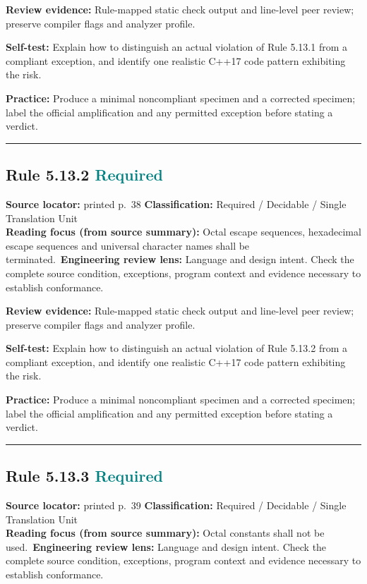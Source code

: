 \documentclass[10pt,letterpaper]{article}
\begin{document}
\textbf{Review evidence:} Rule-mapped static check output and line-level peer review; preserve compiler flags and analyzer profile.

\textbf{Self-test:} Explain how to distinguish an actual violation of Rule 5.13.1 from a compliant exception, and identify one realistic C++17 code pattern exhibiting the risk.\par
\textbf{Practice:} Produce a minimal noncompliant specimen and a corrected specimen; label the official amplification and any permitted exception before stating a verdict.
\smallskip\hrule\smallskip
\subsection*{Rule 5.13.2 \enspace \texorpdfstring{\small\textcolor{teal}{Required}}{Required}}
\noindent\textbf{Source locator:} printed p.~38 \quad\textbf{Classification:} Required / Decidable / Single Translation Unit\\
\textbf{Reading focus (from source summary):} Octal escape sequences, hexadecimal escape sequences and universal character names shall be terminated.\
\textbf{Engineering review lens:} Language and design intent. Check the complete source condition, exceptions, program context and evidence necessary to establish conformance.

\textbf{Review evidence:} Rule-mapped static check output and line-level peer review; preserve compiler flags and analyzer profile.

\textbf{Self-test:} Explain how to distinguish an actual violation of Rule 5.13.2 from a compliant exception, and identify one realistic C++17 code pattern exhibiting the risk.\par
\textbf{Practice:} Produce a minimal noncompliant specimen and a corrected specimen; label the official amplification and any permitted exception before stating a verdict.
\smallskip\hrule\smallskip
\subsection*{Rule 5.13.3 \enspace \texorpdfstring{\small\textcolor{teal}{Required}}{Required}}
\noindent\textbf{Source locator:} printed p.~39 \quad\textbf{Classification:} Required / Decidable / Single Translation Unit\\
\textbf{Reading focus (from source summary):} Octal constants shall not be used.\
\textbf{Engineering review lens:} Language and design intent. Check the complete source condition, exceptions, program context and evidence necessary to establish conformance.
\end{document}

